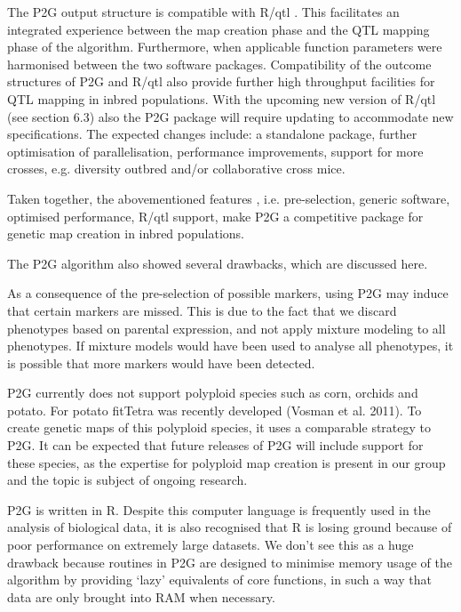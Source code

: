 The P2G output structure is compatible with R/qtl \cite{Broman:2003, Arends:2010}. This facilitates an integrated experience between 
the map creation phase and the QTL mapping phase of the algorithm. Furthermore, when applicable function parameters were harmonised 
between the two software packages. Compatibility of the outcome structures of P2G and R/qtl also provide further high throughput 
facilities for QTL mapping in inbred populations. With the upcoming new version of R/qtl (see section 6.3) also the P2G package will 
require updating to accommodate new specifications. The expected changes include: a standalone package, further optimisation of 
parallelisation, performance improvements, support for more crosses, e.g. diversity outbred and/or collaborative cross mice.

Taken together, the abovementioned features , i.e. pre-selection, generic software, optimised performance, R/qtl support, make P2G a 
competitive package for genetic map creation in inbred populations. 

The P2G algorithm also showed several drawbacks, which are discussed here. 

As a consequence of the pre-selection of possible markers, using P2G may induce that certain markers are missed. This is due to the 
fact that we discard phenotypes based on parental expression, and not apply mixture modeling to all phenotypes. If mixture models 
would have been used to analyse all phenotypes, it is possible that more markers would have been detected.

P2G currently does not support polyploid species such as corn, orchids and potato. For potato fitTetra was recently developed 
(Vosman et al. 2011). To create genetic maps of this polyploid species, it uses a comparable strategy to P2G. It can be expected 
that future releases of P2G will include support for these species, as the expertise for polyploid map creation is present in 
our group and the topic is subject of ongoing research. 

P2G is written in R. Despite this computer language is frequently used in the analysis of biological data, it is also recognised 
that R is losing ground because of poor performance on extremely large datasets. We don’t see this as a huge drawback because 
routines in P2G are designed to minimise memory usage of the algorithm by providing ‘lazy’ equivalents of core functions, in such 
a way that data are only brought into RAM when necessary.

